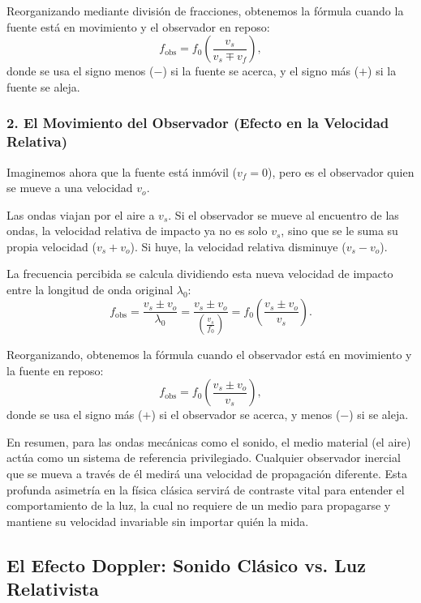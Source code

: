 \documentclass[11pt,a4paper]{book}
\begin{document}
Reorganizando mediante división de fracciones, obtenemos la fórmula cuando la fuente está en movimiento y el observador en reposo:
\begin{equation}
    f_{\text{obs}} = f_0 \left( \frac{v_s}{v_s \mp v_f} \right),
    \label{eq:doppler_fuente}
\end{equation}
donde se usa el signo menos ($-$) si la fuente se acerca, y el signo más ($+$) si la fuente se aleja.

\subsubsection{2. El Movimiento del Observador (Efecto en la Velocidad Relativa)}

Imaginemos ahora que la fuente está inmóvil ($v_f = 0$), pero es el observador quien se mueve a una velocidad $v_o$. 

Las ondas viajan por el aire a $v_s$. Si el observador se mueve al encuentro de las ondas, la velocidad relativa de impacto ya no es solo $v_s$, sino que se le suma su propia velocidad ($v_s + v_o$). Si huye, la velocidad relativa disminuye ($v_s - v_o$).

La frecuencia percibida se calcula dividiendo esta nueva velocidad de impacto entre la longitud de onda original $\lambda_0$:
\begin{equation}
    f_{\text{obs}} = \frac{v_s \pm v_o}{\lambda_0} = \frac{v_s \pm v_o}{\left(\frac{v_s}{f_0}\right)} = f_0 \left( \frac{v_s \pm v_o}{v_s} \right).
\end{equation}

Reorganizando, obtenemos la fórmula cuando el observador está en movimiento y la fuente en reposo:
\begin{equation}
    f_{\text{obs}} = f_0 \left( \frac{v_s \pm v_o}{v_s} \right),
    \label{eq:doppler_observador}
\end{equation}
donde se usa el signo más ($+$) si el observador se acerca, y menos ($-$) si se aleja.


En resumen, para las ondas mecánicas como el sonido, el medio material (el aire) actúa como un sistema de referencia privilegiado. Cualquier observador inercial que se mueva a través de él medirá una velocidad de propagación diferente. Esta profunda asimetría en la física clásica servirá de contraste vital para entender el comportamiento de la luz, la cual no requiere de un medio para propagarse y mantiene su velocidad invariable sin importar quién la mida.


\subsection*{El Efecto Doppler: Sonido Clásico vs. Luz Relativista}
\end{document}
